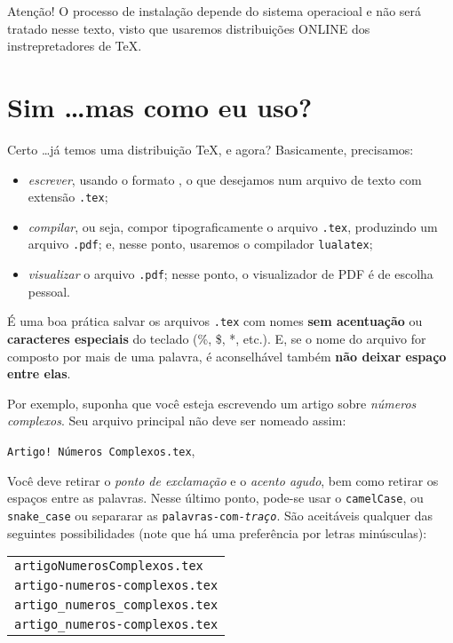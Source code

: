 \begin{atencao}{Atenção!}{\exclamacao}
  O processo de instalação depende do sistema operacioal e não será tratado nesse 
  texto, visto que usaremos distribuições ONLINE dos instrepretadores de \TeX{}.  
\end{atencao}

\section{Sim \ldots mas como eu uso?} %

Certo \ldots já temos uma distribuição \TeX{}, e agora?
Basicamente, precisamos:

\begin{itemize}
  \item \textit{escrever}, usando o formato , o que desejamos num 
    arquivo de texto com extensão \texttt{.tex};
  \item \textit{compilar}, ou seja, compor tipograficamente o arquivo \texttt{.tex}, 
    produzindo um arquivo \texttt{.pdf}; e, nesse ponto, usaremos o compilador 
    \texttt{lualatex};
  \item \textit{visualizar} o arquivo \texttt{.pdf}; nesse ponto, o visualizador
    de PDF é de escolha pessoal.
\end{itemize}

É uma boa prática salvar os arquivos \texttt{.tex} com nomes \textbf{sem acentuação}
ou \textbf{caracteres especiais} do teclado (\%, \$, *, etc.).
E, se o nome do arquivo for composto por mais de uma palavra, é aconselhável 
também \textbf{não deixar espaço entre elas}.

Por exemplo, suponha que você esteja escrevendo um artigo sobre \textit{números complexos}.
Seu arquivo principal não deve ser nomeado assim: 

\begin{center}
  \texttt{Artigo! Números Complexos.tex},
\end{center}

Você deve retirar o \textit{ponto de exclamação} e o \textit{acento agudo}, bem 
como retirar os espaços entre as palavras.
Nesse último ponto, pode-se usar o \texttt{camelCase}, ou \texttt{snake\_case} 
ou separarar as \texttt{palavras-com-\textit{traço}}.
São aceitáveis qualquer das seguintes possibilidades (note que há uma preferência
por letras minúsculas):

\begin{table}[!h]
  \centering
  \begin{tabular}{l}
    \texttt{artigoNumerosComplexos.tex}\\
    \texttt{artigo-numeros-complexos.tex}\\
    \texttt{artigo\_numeros\_complexos.tex}\\
    \texttt{artigo\_numeros-complexos.tex}  
  \end{tabular}
\end{table}


